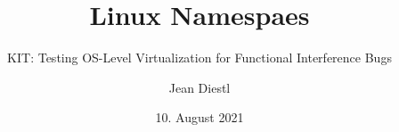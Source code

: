 \documentclass{sdqbeamer}
\title[KIT-Beamer-Vorlage]{Linux Namespaes}
\subtitle{KIT: Testing OS-Level Virtualization
for Functional Interference Bugs}
\author[Jean Diestl]{Jean Diestl}
\date[10.\,8.\,2021]{10. August 2021}
\begin{document}
\KITtitleframe
\end{document}
